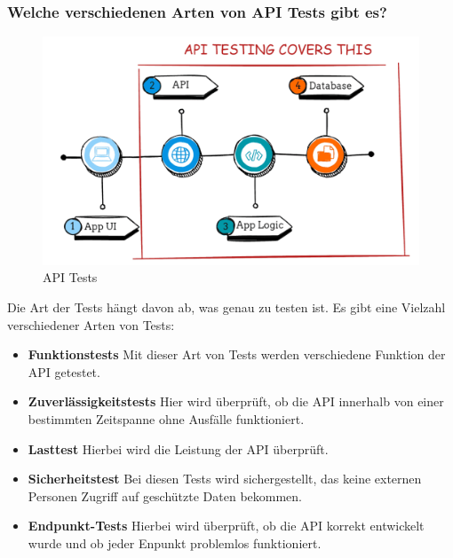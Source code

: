 \subsubsection{Welche verschiedenen Arten von API Tests gibt es?}

\begin{figure}[h!]
    \centering
    \includegraphics[width=0.8\linewidth]{pics/api-tests.png}
    \caption{API Tests}
    \label{fig:enter-label}
\end{figure}


Die Art der Tests hängt davon ab, was genau zu testen ist. Es gibt eine Vielzahl verschiedener Arten von Tests:

\begin{itemize}
    \item \textbf{Funktionstests}
        \newline
        Mit dieser Art von Tests werden verschiedene Funktion der API getestet.
    \item \textbf{Zuverlässigkeitstests}
        \newline
        Hier wird überprüft, ob die API innerhalb von einer bestimmten Zeitspanne ohne Ausfälle funktioniert.
    \item \textbf{Lasttest}
        \newline
        Hierbei wird die Leistung der API überprüft. 
    \item \textbf{Sicherheitstest}
        \newline
        Bei diesen Tests wird sichergestellt, das keine externen Personen Zugriff auf geschützte Daten bekommen.
    \item \textbf{Endpunkt-Tests}
        \newline
        Hierbei wird überprüft, ob die API korrekt entwickelt wurde und ob jeder Enpunkt problemlos funktioniert.
\end{itemize}




